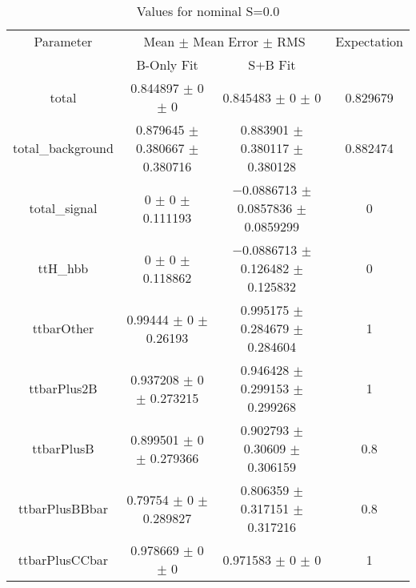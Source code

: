 \begin{table}
\centering
\caption{Values for nominal S=0.0}
\begin{tabular}{cccc}
\toprule
Parameter & \multicolumn{2}{c}{Mean $\pm$ Mean Error $\pm$ RMS} & Expectation\\
 & B-Only Fit & S+B Fit & \\
\midrule
total & \num{0.844897} $\pm$ \num{0} $\pm$ \num{0} & \num{0.845483} $\pm$ \num{0} $\pm$ \num{0} & \num{0.829679}\\
total\_background & \num{0.879645} $\pm$ \num{0.380667} $\pm$ \num{0.380716} & \num{0.883901} $\pm$ \num{0.380117} $\pm$ \num{0.380128} & \num{0.882474}\\
total\_signal & \num{0} $\pm$ \num{0} $\pm$ \num{0.111193} & \num{-0.0886713} $\pm$ \num{0.0857836} $\pm$ \num{0.0859299} & \num{0}\\
ttH\_hbb & \num{0} $\pm$ \num{0} $\pm$ \num{0.118862} & \num{-0.0886713} $\pm$ \num{0.126482} $\pm$ \num{0.125832} & \num{0}\\
ttbarOther & \num{0.99444} $\pm$ \num{0} $\pm$ \num{0.26193} & \num{0.995175} $\pm$ \num{0.284679} $\pm$ \num{0.284604} & \num{1}\\
ttbarPlus2B & \num{0.937208} $\pm$ \num{0} $\pm$ \num{0.273215} & \num{0.946428} $\pm$ \num{0.299153} $\pm$ \num{0.299268} & \num{1}\\
ttbarPlusB & \num{0.899501} $\pm$ \num{0} $\pm$ \num{0.279366} & \num{0.902793} $\pm$ \num{0.30609} $\pm$ \num{0.306159} & \num{0.8}\\
ttbarPlusBBbar & \num{0.79754} $\pm$ \num{0} $\pm$ \num{0.289827} & \num{0.806359} $\pm$ \num{0.317151} $\pm$ \num{0.317216} & \num{0.8}\\
ttbarPlusCCbar & \num{0.978669} $\pm$ \num{0} $\pm$ \num{0} & \num{0.971583} $\pm$ \num{0} $\pm$ \num{0} & \num{1}\\
\bottomrule
\end{tabular}
\end{table}